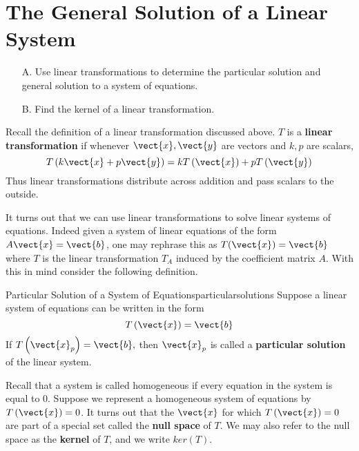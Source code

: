 \section{The General Solution of a Linear System}

\begin{outcome}
\begin{enumerate}
\item[A.]  Use linear transformations to determine the particular solution and general solution to a system of equations.

\item[B.]  Find the kernel of a linear transformation. 
\end{enumerate}
\end{outcome}

Recall the definition of a linear transformation discussed above. 
$T$ is a \textbf{linear transformation} if whenever $\vect{x}, \vect{y}$ are
vectors and $k,p$ are scalars,
\begin{equation*}
T\left( k\vect{x}+p\vect{y}\right) =k T \left( \vect{x} \right) +p T\left(\vect{y} \right)
\end{equation*}
Thus linear transformations distribute across addition and pass scalars to
the outside.

It turns out that we can use linear transformations to solve linear
systems of equations. Indeed given a system of linear equations of the
form $A\vect{x}=\vect{b}$, one may rephrase this as $T(\vect{x})=\vect{b}$ where $T$ is the linear
transformation $T_A$ induced by the coefficient matrix $A$. With this in mind consider the following definition. 

\begin{definition}{Particular Solution of a System of Equations}{particularsolutions}
Suppose a linear system of equations can be written in the form
\begin{equation*}
T\left(\vect{x}\right)=\vect{b}
\end{equation*}
If $T\left(\vect{x}_{p}\right)=\vect{b},$ 
then $\vect{x}_{p}$ is called a \textbf{particular solution} of
 the linear system.
\end{definition}

Recall that a system is called homogeneous if every equation in the system is equal to $0$. 
Suppose we represent a homogeneous system of equations by $T\left(\vect{x}\right)=0$. It turns out
that the $\vect{x}$ for which $T \left(\vect{x}\right) = 0$ are part of a special set called the \textbf{null space}
of $T$. We may also refer to the null space as the \textbf{kernel} of $T$, and we write $ker\left(T\right)$. 

